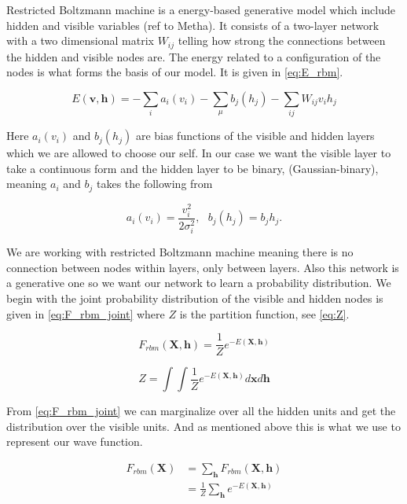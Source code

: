 Restricted Boltzmann machine is a energy-based generative model which include hidden and visible variables (ref to Metha). It consists of a two-layer network with a two dimensional matrix $W_{ij}$ telling how strong the connections between the hidden and visible nodes are. The energy related to a configuration of the nodes is what forms the basis of our model. It is given in \eqref{eq:E_rbm}.

\begin{equation}\label{eq:E_rbm}
E(\mathbf{v}, \mathbf{h}) = - \sum_{i} a_i(v_i) - \sum_{\mu} b_j(h_j) - \sum_{ij} W_{ij}v_i h_j 
\end{equation}

Here $a_i(v_i)$ and $b_j(h_j)$ are bias functions of the visible and hidden layers which we are allowed to choose our self. In our case we want the visible layer to take a continuous form and the hidden layer to be binary, (Gaussian-binary), meaning $a_i$ and $b_j$ takes the following from

$$a_i(v_i) = \frac{v_i^2}{2 \sigma_i^2}, \ \ \ b_j(h_j)= b_jh_j.$$

We are working with restricted Boltzmann machine meaning there is no connection between nodes within layers, only between layers. Also this network is a generative one so we want our network to learn a probability distribution. We begin with the joint probability distribution of the visible and hidden nodes is given in \eqref{eq:F_rbm_joint} where $Z$ is the partition function, see \eqref{eq:Z}. 

\begin{equation}\label{eq:F_rbm_joint}
F_{rbm} (\mathbf{X}, \mathbf{h}) = \frac{1}{Z} e^{-E(\mathbf{X}, \mathbf{h})}
\end{equation}

\begin{equation}\label{eq:Z}
Z = \int \int \frac{1}{Z} e^{-E(\mathbf{X}, \mathbf{h})} d\mathbf{x}d\mathbf{h}
\end{equation}

From \eqref{eq:F_rbm_joint} we can marginalize over all the hidden units and get the distribution over the visible units. And as mentioned above this is what we use to represent our wave function. 

\begin{align}\label{eq:F_rbm_marg}
F_{rbm} (\mathbf{X}) &= \sum_{\mathbf{h}} F_{rbm} (\mathbf{X}, \mathbf{h}) \\
&= \frac{1}{Z} \sum_{\mathbf{h}} e^{-E(\mathbf{X}, \mathbf{h})}
\end{align}

